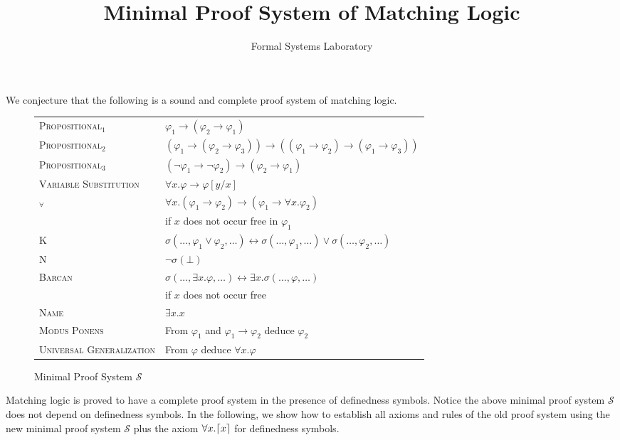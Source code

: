 \documentclass{article}
\title{Minimal Proof System of Matching Logic}
\author{Formal Systems Laboratory}
\newcommand{\imp}{\rightarrow}
\newcommand{\dimp}{\leftrightarrow}
\DeclarePairedDelimiter\ceil{\lceil}{\rceil}
\newcommand{\miniPS}{\mathcal{S}}
\begin{document}
	\maketitle

We conjecture that the following is a sound and complete proof system of 
matching logic. 
\begin{figure}[hbtp]
\def\arraystretch{1.25}
\begin{longtable}{ll}
	 \textsc{Propositional$_1$}
  &  $\varphi_1 \imp (\varphi_2 \imp \varphi_1)$
  \\
     \textsc{Propositional$_2$}
  &  $(\varphi_1 \imp (\varphi_2 \imp \varphi_3)) 
      \imp ((\varphi_1 \imp \varphi_2) \imp (\varphi_1 \imp \varphi_3))$
  \\
     \textsc{Propositional$_3$}
  &  $(\neg \varphi_1 \imp \neg \varphi_2) \imp (\varphi_2 \imp \varphi_1)$
  \\
     \textsc{Variable Substitution}
  &  $\forall x . \varphi \imp \varphi[y/x]$
  \\
     \textsc{$_\forall$}
  &  $\forall x . (\varphi_1 \imp \varphi_2) 
     \imp (\varphi_1 \imp \forall x . \varphi_2)$
  \\
  &
     if $x$ does not occur free in $\varphi_1$
  \\
     \textsc{K}
  &  $\sigma(\dots,\varphi_1 \vee \varphi_2,\dots) 
      \dimp
      \sigma(\dots,\varphi_1,\dots) \vee \sigma(\dots,\varphi_2,\dots)$
  \\
     \textsc{N}
　　&  $\neg \sigma(\bot)$
　　\\
     \textsc{Barcan}
  &  $\sigma(\dots,\exists x . \varphi,\dots) \dimp \exists x . 
      \sigma(\dots, \varphi,\dots)$
  \\
  &
     if $x$ does not occur free
  \\
    \textsc{Name}
  & $\exists x . x$
  \\
    \textsc{Modus Ponens}
  &  From $\varphi_1$ and $\varphi_1 \imp \varphi_2$ deduce $\varphi_2$
  \\
    \textsc{Universal Generalization}
  &  From $\varphi$ deduce $\forall x . \varphi$
\end{longtable}
\caption{Minimal Proof System $\miniPS$}
\end{figure}

Matching logic is proved to have a complete proof system in the presence of 
definedness symbols.
Notice the above minimal proof system $\miniPS$ does not depend on definedness 
symbols.
In the following, we show how to establish all axioms and rules of the old 
proof system using the new minimal proof system $\miniPS$ plus the 
axiom $\forall x . \ceil{x}$ for definedness symbols.
\end{document}
